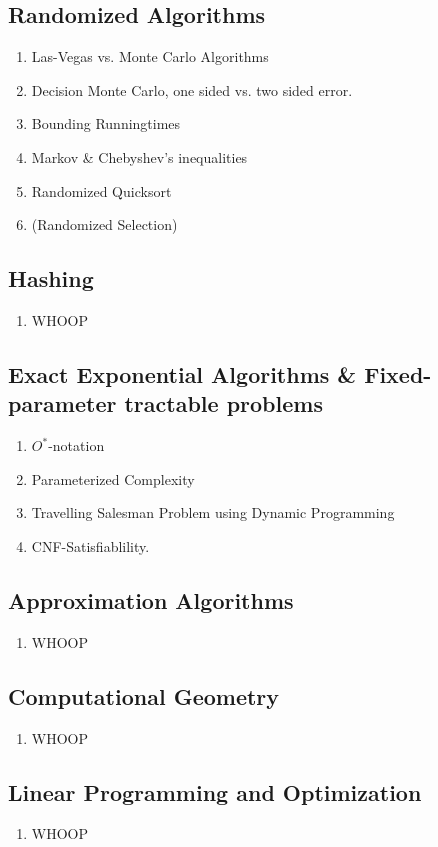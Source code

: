 \subsection{Randomized Algorithms}
\begin{enumerate}
  \item Las-Vegas vs. Monte Carlo Algorithms
  \item Decision Monte Carlo, one sided vs. two sided error.
  \item Bounding Runningtimes
  \item Markov \& Chebyshev's inequalities
  \item Randomized Quicksort
  \item (Randomized Selection)
\end{enumerate}
\newpage

\subsection{Hashing}
\begin{enumerate}
  \item WHOOP
\end{enumerate}
\newpage

\subsection{Exact Exponential Algorithms \& Fixed-parameter tractable problems}
\begin{enumerate}
  \item $O^*$-notation
  \item Parameterized Complexity
  \item Travelling Salesman Problem using Dynamic Programming
  \item CNF-Satisfiablility.
\end{enumerate}
\newpage

\subsection{Approximation Algorithms}
\begin{enumerate}
  \item WHOOP
\end{enumerate}
\newpage

\subsection{Computational Geometry}
\begin{enumerate}
  \item WHOOP
\end{enumerate}
\newpage

\subsection{Linear Programming and Optimization}
\begin{enumerate}
  \item WHOOP
\end{enumerate}
\newpage